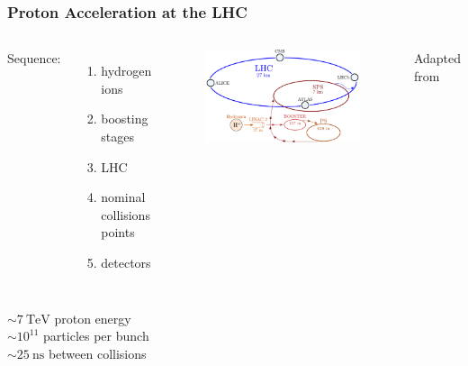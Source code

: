 \documentclass[14pt, t]{beamer}
\begin{document}
\begin{frame}
    \frametitle{Proton Acceleration at the LHC}
    \begin{columns}
        Sequence:
        \begin{enumerate}
        
            \item hydrogen ions

            \item boosting stages

            \item LHC

            \item nominal collisions points

            \item detectors
        
        \end{enumerate}

        \begin{figure}[t!]
            \centering
            \includegraphics[width=\columnwidth]{vector/cern-complex.pdf}
        \end{figure}
        \vspace{-3mm}
        \hfill
        \tiny{Adapted from \cite{image-cern-complex}}
        
    \end{columns}

    \vspace{3mm}
    $ \sim \SI{7}{\tera \electronvolt} $ proton energy\\
    $ \sim 10^{11} $ particles per bunch\\
    $ \sim \SI{25}{\nano \second} $ between collisions
    
\end{frame}
\end{document}
